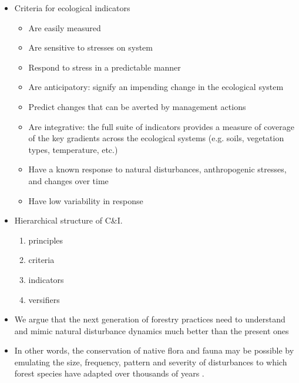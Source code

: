 \documentclass{article}
\begin{document}
\begin{itemize}
    \item Criteria for ecological indicators \cite{dale2001challenges} 
    \begin{itemize}
        \item Are easily measured
        \item Are sensitive to stresses on system
        \item Respond to stress in a predictable manner
        \item Are anticipatory: signify an impending change in the ecological system
        \item Predict changes that can be averted by management actions
        \item Are integrative: the full suite of indicators provides a measure of coverage of the key gradients across the ecological systems (e.g. soils, vegetation types, temperature, etc.)
        \item Have a known response to natural disturbances, anthropogenic stresses, and changes over time
        \item  Have low variability in response
        \end{itemize}
    \item Hierarchical structure of C&I. \cite{mendoza2000development}
        \begin{enumerate}
            \item principles
            \item criteria
            \item indicators
            \item versifiers
        \end{enumerate}
    \item We argue that the next generation of forestry practices need to understand and mimic natural disturbance dynamics much better than the present ones \cite{bengtsson2000biodiversity}
    \item In other words, the conservation of native flora and fauna may be possible by emulating the size, frequency, pattern and severity of disturbances to which forest species have adapted over thousands of years \cite{hunter1990wildlife} \cite{hunter1988paleoecology}.
\end{itemize}
\end{document}
